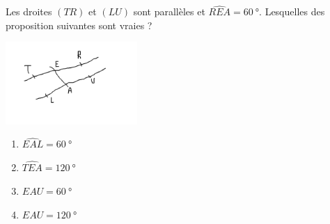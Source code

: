 
\begin{exercice}\label{exo2smath-0098}

Les droites \( (TR)\) et \( (LU)\) sont parallèles et \( \widehat{REA}=\SI{60}{\degree}\). Lesquelles des proposition suivantes sont vraies ?

\includegraphics[width=5cm]{faux_angles.pdf}

\begin{multicols}{2}
\begin{enumerate}
    \item
        \( \widehat{EAL}=\SI{60}{\degree}\)
    \item
        \( \widehat{TEA}=\SI{120}{\degree}\)
    \item
        \( \widehat{EAU}=\SI{60}{\degree}\)
    \item
        \( \widehat{EAU}=\SI{120}{\degree}\)
\end{enumerate}
\end{multicols}

\end{exercice}
